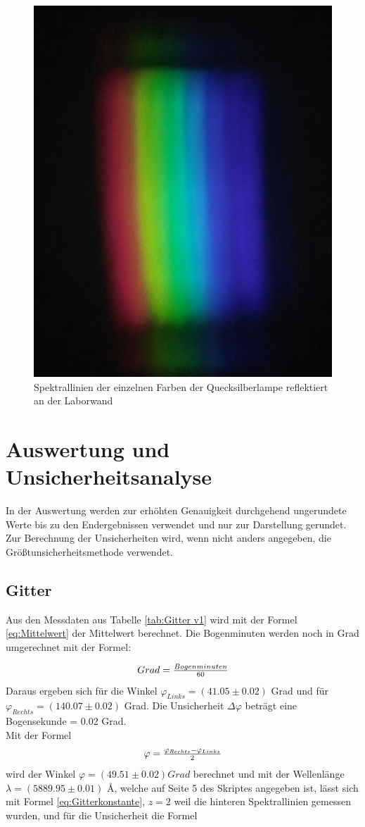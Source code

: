 \documentclass[12pt,a4paper,twoside]{article}
\begin{document}
\begin{figure}[H]
    \centering
    \includegraphics[width=0.6\linewidth]{nudes/rgb wand.jpg}
    \caption{Spektrallinien der einzelnen Farben der Quecksilberlampe reflektiert an der Laborwand}
    \label{fig:spektallinien Prisma}
\end{figure}

\section{Auswertung und Unsicherheitsanalyse} %
In der Auswertung werden zur erhöhten Genauigkeit durchgehend ungerundete Werte bis zu den Endergebnissen verwendet und nur zur Darstellung gerundet. \\
Zur Berechnung der Unsicherheiten wird, wenn nicht anders angegeben, die Größtunsicherheitsmethode verwendet.

\subsection{Gitter}
Aus den Messdaten aus Tabelle \ref{tab:Gitter v1} wird mit der Formel \ref{eq:Mittelwert} der Mittelwert berechnet. Die Bogenminuten werden noch in Grad umgerechnet mit der Formel: 

\begin{equation}
    \label{eq:Bogenwix}
    \centerline{$Grad = \frac{Bogenminuten}{60}$}
\end{equation}
Daraus ergeben sich für die Winkel $\varphi_{Links} = (41.05 \pm 0.02)$ Grad und für $\varphi_{Rechts} = (140.07 \pm 0.02) $ Grad. Die Unsicherheit $\Delta \varphi $ beträgt eine Bogensekunde = 0.02 Grad. 
\\
Mit der Formel
\begin{equation}
    \label{eq:formel für gitterwix}
    \centerline{$\varphi = \frac{\varphi_{Rechts} - \varphi_{Links}}{2}$}
\end{equation}
wird der Winkel $\varphi = (49.51 \pm 0.02) Grad$ berechnet und mit der Wellenlänge $\lambda = (5889.95 \pm 0.01)$ \AA, welche auf Seite 5 des Skriptes \cite{teachcenter2} angegeben ist, lässt sich mit Formel \ref{eq:Gitterkonstante}, $z=2$ weil die hinteren Spektrallinien gemessen wurden, und für die Unsicherheit die Formel 
\end{document}
